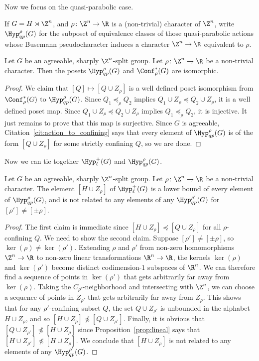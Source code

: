 Now we focus on the quasi-parabolic case.

If $G = H \rtimes \Z^n$, and $\rho\colon\Z^n\to\R$ is a (non-trivial) character of $\Z^n$, write $\Hyp_{qp}^\rho(G)$ for the subposet of equivalence classes of those quasi-parabolic actions whose Busemann pseudocharacter induces a character $\Z^n\to\R$ equivalent to $\rho$.

\begin{prop}
\label{prop:qp}

Let $G$ be an agreeable, sharply $\Z^n$-split group. Let $\rho \colon \Z^n \to \R$ be a non-trivial character. Then the posets $\Hyp_{qp}^\rho(G)$ and $\Conf^\ast_\rho(G)$ are isomorphic.
\end{prop}

\begin{proof}
We claim that $[Q]\mapsto [Q\cup Z_\rho]$ is a well defined poset isomorphism from $\Conf^\ast_\rho(G)$ to $\Hyp_{qp}^\rho(G)$. Since $Q_1\preceq_\rho Q_2$ implies $Q_1\cup Z_\rho\preceq Q_2\cup Z_\rho$, it is a well defined poset map. Since $Q_1\cup Z_\rho\preceq Q_2\cup Z_\rho$ implies $Q_1\preceq_\rho Q_2$, it is injective. It just remains to prove that this map is surjective. Since $G$ is agreeable, Citation~\ref{cit:action_to_confining} says that every element of $\Hyp_{qp}^\rho(G)$ is of the form $[Q\cup Z_\rho]$ for some strictly confining $Q$, so we are done.
\end{proof}

Now we can tie together $\Hyp_\ell^+(G)$ and $\Hyp_{qp}^\rho(G)$.

\begin{prop}\label{prop:linvsqp}
Let $G$ be an agreeable, sharply $\Z^n$-split group. Let $\rho \colon \Z^n \to \R$ be a non-trivial character. The element $[H\cup Z_\rho]$ of $\Hyp_\ell^+(G)$ is a lower bound of every element of $\Hyp_{qp}^\rho(G)$, and is not related to any elements of any $\Hyp_{qp}^{\rho'}(G)$ for $[\rho']\ne[\pm\rho]$.
\end{prop}

\begin{proof}
The first claim is immediate since $[H\cup Z_\rho]\preccurlyeq [Q\cup Z_\rho]$ for all $\rho$-confining $Q$. We need to show the second claim. Suppose $[\rho']\ne [\pm\rho]$, so $\ker(\rho)\ne\ker(\rho')$. Extending $\rho$ and $\rho'$ from non-zero homomorphisms $\Z^n\to\R$ to non-zero linear transformations $\R^n\to\R$, the kernels $\ker(\rho)$ and $\ker(\rho')$ become distinct codimension-$1$ subspaces of $\R^n$. We can therefore find a sequence of points in $\ker(\rho')$ that gets arbitrarily far away from $\ker(\rho)$. Taking the $C_{\rho'}$-neighborhood and intersecting with $\Z^n$, we can choose a sequence of points in $Z_{\rho'}$ that gets arbitrarily far away from $Z_\rho$. This shows that for any $\rho'$-confining subset $Q$, the set $Q\cup Z_{\rho'}$ is unbounded in the alphabet $H\cup Z_{\rho}$, and so $[H\cup Z_\rho]\not\preccurlyeq[Q\cup Z_{\rho'}]$. Finally, it is obvious that $[Q\cup Z_{\rho'}]\not\preccurlyeq[H\cup Z_\rho]$ since Proposition~\ref{prop:lineal} says that $[H\cup Z_{\rho'}]\not\preccurlyeq [H\cup Z_\rho]$. We conclude that $[H\cup Z_\rho]$ is not related to any elements of any $\Hyp_{qp}^{\rho'}(G)$.
\end{proof}

